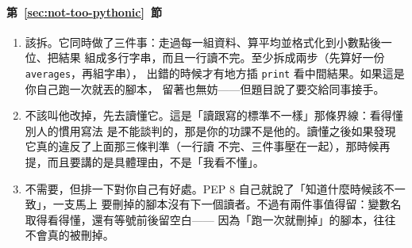 \paragraph{第~\ref{sec:not-too-pythonic}~節}
\begin{enumerate}
\item 該拆。它同時做了三件事：走過每一組資料、算平均並格式化到小數點後一位、把結果
組成多行字串，而且一行讀不完。至少拆成兩步（先算好一份 \texttt{averages}，再組字串），
出錯的時候才有地方插 \texttt{print} 看中間結果。如果這是你自己跑一次就丟的腳本，
留著也無妨——但題目說了要交給同事接手。
\item 不該叫他改掉，先去讀懂它。這是「讀跟寫的標準不一樣」那條界線：看得懂別人的慣用寫法
是不能談判的，那是你的功課不是他的。讀懂之後如果發現它真的違反了上面那三條判準（一行讀
不完、三件事壓在一起），那時候再提，而且要講的是具體理由，不是「我看不懂」。
\item 不需要，但排一下對你自己有好處。PEP 8 自己就說了「知道什麼時候該不一致」，一支馬上
要刪掉的腳本沒有下一個讀者。不過有兩件事值得留：變數名取得看得懂，還有等號前後留空白——
因為「跑一次就刪掉」的腳本，往往不會真的被刪掉。
\end{enumerate}

